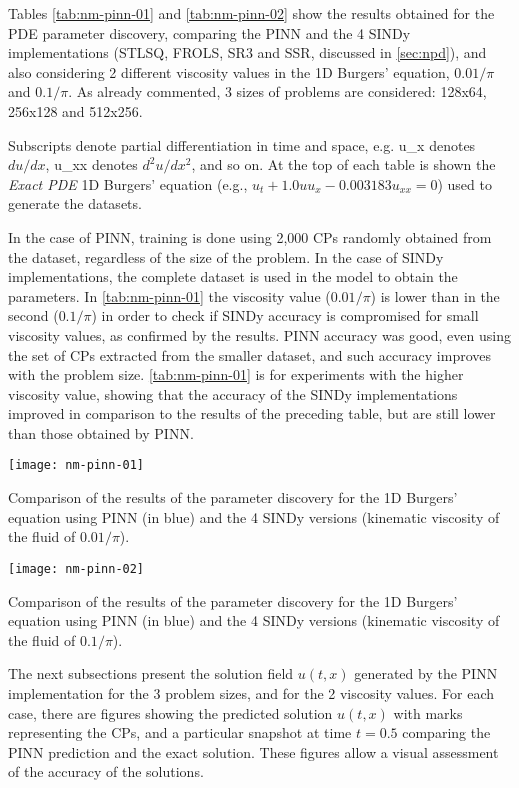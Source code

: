 \documentclass[conference]{IEEEtran}
\begin{document}
Tables \ref{tab:nm-pinn-01} and \ref{tab:nm-pinn-02} show the results obtained for the PDE parameter discovery, comparing the  PINN and the 4 SINDy implementations (STLSQ, FROLS, SR3 and SSR, discussed in \autoref{sec:npd}), and also considering 2 different viscosity values in the 1D Burgers' equation, ${0.01}/{\pi}$ and ${0.1}/{\pi}$. As already commented, 3 sizes of problems are considered: 128x64, 256x128 and 512x256. 

Subscripts denote partial differentiation in time and space, e.g. u\_x denotes ${du}/{dx}$, u\_xx denotes ${d^2u}/{dx^2}$, and so on. 
At the top of each table is shown the \textit{Exact PDE} 1D Burgers' equation (e.g., $u_t + 1.0 u u_x - 0.003183 u_{xx} = 0$) used to generate the datasets.

In the case of PINN, training is done using 2,000 CPs randomly obtained from the dataset, regardless of the size of the problem. 
In the case of SINDy implementations, the complete dataset is used in the model to obtain the parameters. In \ref{tab:nm-pinn-01} the viscosity value (${0.01}/{\pi}$) is lower than in the second (${0.1}/{\pi}$) in order to check if SINDy accuracy is compromised for  small viscosity values, as confirmed by the results. PINN accuracy was good, even using the set of CPs extracted from the smaller dataset, and such accuracy improves with the problem size. \ref{tab:nm-pinn-01} is for experiments with the higher viscosity value, showing that the accuracy of the SINDy implementations improved in comparison to the results of the preceding table, but are still lower than those obtained by PINN.

\begin{table}[htb]\centering
\texttt{[image: nm-pinn-01]}
\caption{Comparison of the results of the parameter discovery for the 1D Burgers' equation using PINN (in blue) and the 4 SINDy versions (kinematic viscosity of the fluid of ${0.01}/{\pi}$).}
\label{tab:nm-pinn-01}
\end{table}

\begin{table}[htb]\centering
\texttt{[image: nm-pinn-02]}
\caption{Comparison of the results of the parameter discovery for the 1D Burgers' equation using PINN (in blue) and the 4 SINDy versions (kinematic viscosity of the fluid of ${0.1}/{\pi}$).}
\label{tab:nm-pinn-02}
\end{table}

 The next subsections present the solution field $u(t,x)$ generated by the PINN implementation for the 3 problem sizes, and for the 2 viscosity values. For each case, there are figures showing the predicted solution $u(t,x)$ with marks representing the CPs, and a particular snapshot at time $t=0.5$ comparing the PINN prediction and the exact solution. These figures allow a visual assessment of the accuracy of the solutions.
\end{document}
